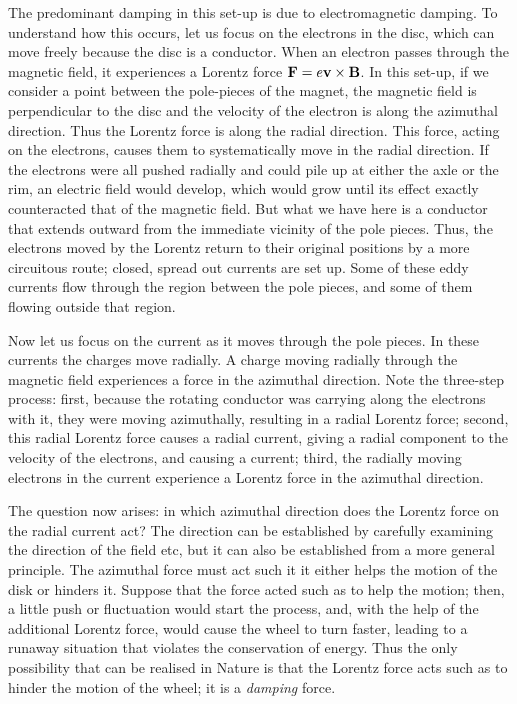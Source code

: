 The predominant damping in this set-up is due to electromagnetic damping. To understand how this occurs, let us focus on the electrons in the disc, which can move freely because the disc is a conductor. When an electron passes through the magnetic field, it experiences a Lorentz force $\vb{F} = e \vb{v} \times \vb{B}$. In this set-up, if we consider a point between the pole-pieces of the magnet, the magnetic field is perpendicular to the disc and the velocity of the electron is along the azimuthal direction. Thus the Lorentz force is along the radial direction. This force, acting on the electrons, causes them to systematically move in the radial direction. If the electrons were all pushed radially and could pile up at either the axle or the rim, an electric field would develop, which would grow until its effect exactly counteracted that of the magnetic field. But what we have here is a conductor that extends outward from the immediate vicinity of the pole pieces. Thus, the electrons moved by the Lorentz return to their original positions by a more circuitous route; closed, spread out currents are set up. Some of these eddy currents flow through the region between the pole pieces, and some of them flowing outside that region. 

Now let us focus on the current as it moves through the pole pieces. In these currents the charges move radially. A charge moving radially through the magnetic field experiences a force in the azimuthal direction. Note the three-step process: first, because the rotating conductor was carrying along the electrons with it, they were moving azimuthally, resulting in a radial Lorentz force; second, this radial Lorentz force causes a radial current, giving a radial component to the velocity of the electrons, and causing a current; third, the radially moving electrons in the current experience a Lorentz force in the azimuthal direction.

The question now arises: in which azimuthal direction does the Lorentz force on the radial current act? The direction can be established by carefully examining the direction of the field etc, but it can also be established from a more general principle. The azimuthal force must act such it it either helps the motion of the disk or hinders it. Suppose that the force acted such as to help the motion; then, a little push or fluctuation would start the process, and, with the help of the additional Lorentz force, would cause the wheel to turn faster, leading to a runaway situation that violates the conservation of energy. Thus the only possibility that can be realised in Nature is that the Lorentz force acts such as to hinder the motion of the wheel; it is a \textsl{damping} force.

